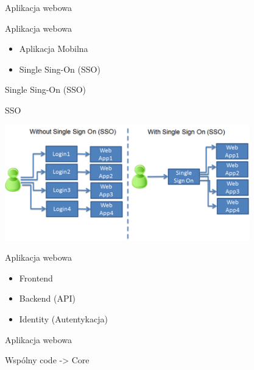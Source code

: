 \documentclass{beamer}
\begin{document}
\begin{frame}{}
	\begin{center}
		\Huge{Aplikacja webowa}
	\end{center}
\end{frame}

\begin{frame}{Aplikacja webowa}
	\begin{huge}
		\begin{itemize}[<+->]
			\item Aplikacja Mobilna
			\item Single Sing-On (SSO)
		\end{itemize}
	\end{huge}
\end{frame}

\begin{frame}{}
	\begin{center}
		\Huge{Single Sing-On (SSO)}
	\end{center}
\end{frame}

\begin{frame}{SSO}
	\begin{center}
  		\includegraphics[height=5cm]{sso2.png}
	\end{center}
\end{frame}

\begin{frame}{Aplikacja webowa}
	\begin{huge}
		\begin{itemize}
			\item Frontend
			\item Backend (API)
			\item Identity (Autentykacja)
		\end{itemize}
	\end{huge}
\end{frame}

\begin{frame}{Aplikacja webowa}
	\begin{center}
		\Huge{Wspólny code -> Core}
	\end{center}
\end{frame}
\end{document}
